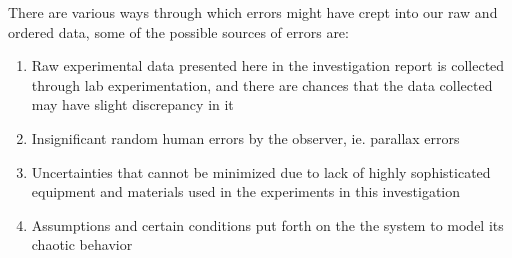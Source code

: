 {There are various ways through which errors might have crept into our raw and ordered data, some of the possible sources of errors are:}
      
      \begin{enumerate}
          \item {Raw experimental data presented here in the investigation report is collected through lab experimentation, and there are chances that the data collected may have slight discrepancy in it}
          \item {Insignificant random human errors by the observer, ie. parallax errors}
          \item {Uncertainties that cannot be minimized due to lack of highly sophisticated equipment and materials used in the experiments in this investigation}
          \item {Assumptions and certain conditions put forth on the the system to model its chaotic behavior}
      \end{enumerate}

